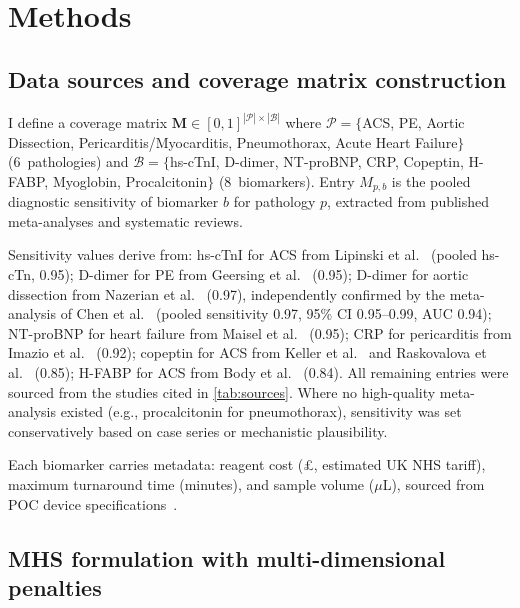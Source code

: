 \documentclass[times, twoside, watermark]{zHenriquesLab-StyleBioRxiv}
\begin{document}
\section*{Methods}

\subsection*{Data sources and coverage matrix construction}

I define a coverage matrix $\mathbf{M} \in [0,1]^{|\mathcal{P}| \times |\mathcal{B}|}$ where $\mathcal{P} = \{$ACS, PE, Aortic Dissection, Pericarditis/Myocarditis, Pneumothorax, Acute Heart Failure$\}$ (6~pathologies) and $\mathcal{B} = \{$hs-cTnI, D-dimer, NT-proBNP, CRP, Copeptin, H-FABP, Myoglobin, Procalcitonin$\}$ (8~biomarkers). Entry $M_{p,b}$ is the pooled diagnostic sensitivity of biomarker $b$ for pathology $p$, extracted from published meta-analyses and systematic reviews.

Sensitivity values derive from: hs-cTnI for ACS from Lipinski et al.~\cite{Lipinski2015} (pooled hs-cTn, 0.95); D-dimer for PE from Geersing et al.~\cite{Geersing2012} (0.95); D-dimer for aortic dissection from Nazerian et al.~\cite{Nazerian2014} (0.97), independently confirmed by the meta-analysis of Chen et al.~\cite{Chen2023} (pooled sensitivity 0.97, 95\% CI 0.95--0.99, AUC 0.94); NT-proBNP for heart failure from Maisel et al.~\cite{Maisel2002} (0.95); CRP for pericarditis from Imazio et al.~\cite{Imazio2011} (0.92); copeptin for ACS from Keller et al.~\cite{Keller2011} and Raskovalova et al.~\cite{Raskovalova2013} (0.85); H-FABP for ACS from Body et al.~\cite{Body2015} (0.84). All remaining entries were sourced from the studies cited in \cref{tab:sources}. Where no high-quality meta-analysis existed (e.g., procalcitonin for pneumothorax), sensitivity was set conservatively based on case series or mechanistic plausibility.

Each biomarker carries metadata: reagent cost (\pounds, estimated UK NHS tariff), maximum turnaround time (minutes), and sample volume ($\mu$L), sourced from POC device specifications~\cite{VanDongen2024,StJohn2014,Howick2014}.

\subsection*{MHS formulation with multi-dimensional penalties}
\end{document}
